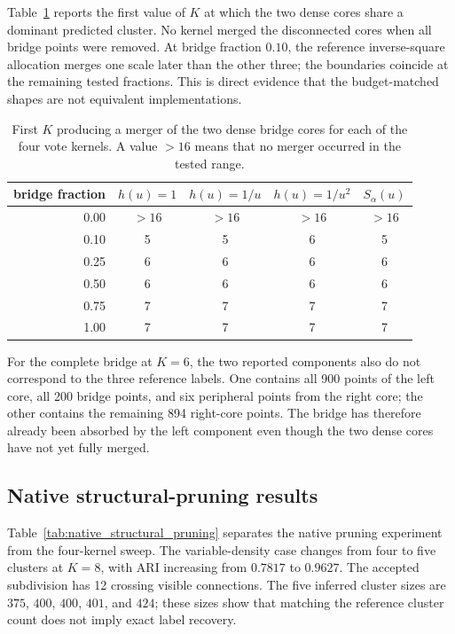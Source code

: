 \documentclass[review,12pt]{elsarticle}
\begin{document}
Table~\ref{tab:bridge_transition} reports the first value of $K$ at which the two dense cores share a dominant predicted cluster. No kernel merged the disconnected cores when all bridge points were removed. At bridge fraction $0.10$, the reference inverse-square allocation merges one scale later than the other three; the boundaries coincide at the remaining tested fractions. This is direct evidence that the budget-matched shapes are not equivalent implementations.

\begin{table}[t]
\caption{First $K$ producing a merger of the two dense bridge cores for each of
the four vote kernels. A value $>16$ means that no merger occurred in the
tested range.}\label{tab:bridge_transition}
\centering
\begin{tabular}{rcccc}
\toprule
bridge fraction & $h(u)=1$ & $h(u)=1/u$ & $h(u)=1/u^2$ & $S_\alpha(u)$\\
\midrule
0.00 & $>16$ & $>16$ & $>16$ & $>16$\\
0.10 & 5 & 5 & 6 & 5\\
0.25 & 6 & 6 & 6 & 6\\
0.50 & 6 & 6 & 6 & 6\\
0.75 & 7 & 7 & 7 & 7\\
1.00 & 7 & 7 & 7 & 7\\
\bottomrule
\end{tabular}
\end{table}

For the complete bridge at $K=6$, the two reported components also do not
correspond to the three reference labels.  One contains all 900 points of the
left core, all 200 bridge points, and six peripheral points from the right
core; the other contains the remaining 894 right-core points.  The bridge has
therefore already been absorbed by the left component even though the two dense
cores have not yet fully merged.

\subsection{Native structural-pruning results}
\label{sec:structural_pruning_results}

Table~\ref{tab:native_structural_pruning} separates the native pruning
experiment from the four-kernel sweep.  The variable-density case changes from
four to five clusters at $K=8$, with ARI increasing from $0.7817$ to $0.9627$.
The accepted subdivision has 12 crossing visible connections. The five
inferred cluster sizes are $375$, $400$, $400$, $401$, and $424$; these sizes
show that matching the reference cluster count does not imply exact label
recovery.
\end{document}
